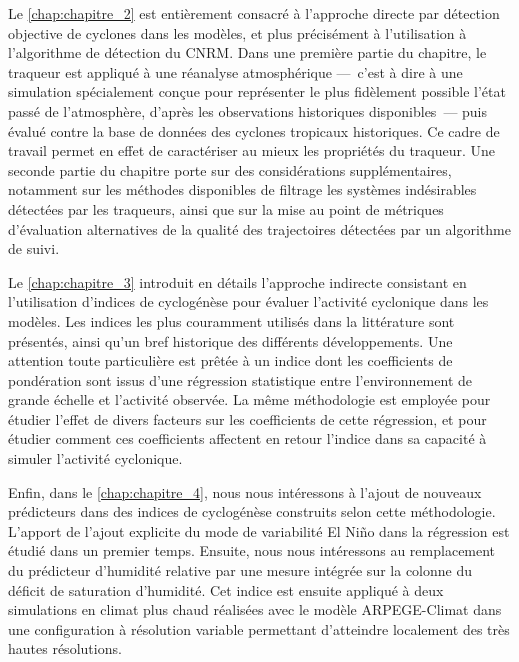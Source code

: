\documentclass[../main.tex]{subfiles}
\begin{document}
Le \cref{chap:chapitre_2} est entièrement consacré à l'approche directe par détection objective de cyclones dans les modèles, et plus précisément à
l'utilisation à l'algorithme de détection du CNRM. Dans une première partie du chapitre, le traqueur est appliqué à une réanalyse atmosphérique ---~c'est à dire
à une simulation spécialement conçue pour représenter le plus fidèlement possible l'état passé de l'atmosphère, d'après les observations historiques
disponibles~--- puis évalué contre la base de données des cyclones tropicaux historiques. Ce cadre de travail permet en effet de caractériser au mieux les
propriétés du traqueur. Une seconde partie du chapitre porte sur des considérations supplémentaires, notamment sur les méthodes disponibles de filtrage les
systèmes indésirables détectées par les traqueurs, ainsi que sur la mise au point de métriques d'évaluation alternatives de la qualité des trajectoires
détectées par un algorithme de suivi.

Le \cref{chap:chapitre_3} introduit en détails l’approche indirecte consistant en l’utilisation d’indices de cyclogénèse pour évaluer l’activité cyclonique dans les
modèles. Les indices les plus couramment utilisés dans la littérature sont présentés, ainsi qu’un bref historique des différents développements. Une attention
toute particulière est prêtée à un indice dont les coefficients de pondération sont issus d’une régression statistique entre l’environnement de grande échelle
et l’activité observée. La même méthodologie est employée pour étudier l’effet de divers facteurs sur les coefficients de cette régression, et pour étudier
comment ces coefficients affectent en retour l’indice dans sa capacité à simuler l’activité cyclonique.

Enfin, dans le \cref{chap:chapitre_4}, nous nous intéressons à l’ajout de nouveaux prédicteurs dans des indices de cyclogénèse construits selon cette
méthodologie. L’apport de l’ajout explicite du mode de variabilité El Niño dans la régression est étudié dans un premier temps. Ensuite, nous nous intéressons
au remplacement du prédicteur d'humidité relative par une mesure intégrée sur la colonne du déficit de saturation d’humidité. Cet indice est ensuite appliqué à
deux simulations en climat plus chaud réalisées avec le modèle ARPEGE-Climat dans une configuration à résolution variable permettant d'atteindre localement des
très hautes résolutions.
\end{document}
